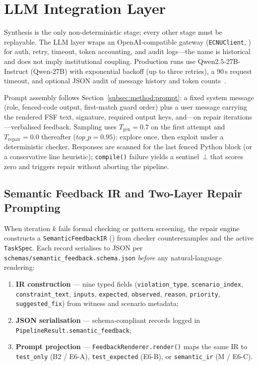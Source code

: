 \section{LLM Integration Layer}
\label{sec:impl:llm}

Synthesis is the only non-deterministic stage; every other stage must be
replayable.
The LLM layer wraps an OpenAI-compatible gateway
(\texttt{ECNUClient}, ) for auth, retry, timeout,
token accounting, and audit logs---the name is historical and does not imply
institutional coupling.
Production runs use Qwen2.5-27B-Instruct (\textsf{Qwen-27B}) with exponential
backoff (up to three retries), a 90\,s request timeout, and optional JSON
audit of message history and token counts~\citep{openai2023gpt4,chen2021codex}.

Prompt assembly follows Section~\ref{subsec:method:prompt}: a fixed system
message (role, fenced-code output, first-match guard order) plus a user
message carrying the rendered FSF text, signature, required output keys, and---on
repair iterations---verbalised feedback.
Sampling uses $T_\text{gen}{=}0.7$ on the first attempt and
$T_\text{repair}{=}0.0$ thereafter ($\mathit{top\_p}{=}0.95$): explore once,
then exploit under a deterministic checker.
Responses are scanned for the last fenced Python block (or a conservative
line heuristic); \texttt{compile()} failure yields a sentinel~$\bot$ that
scores zero and triggers repair without aborting the pipeline.

\subsection{Semantic Feedback IR and Two-Layer Repair Prompting}
\label{sec:impl:repair-feedback}

When iteration $k$ fails formal checking or pattern screening, the repair
engine constructs a \texttt{SemanticFeedbackIR}
() from checker counterexamples and the
active \texttt{TaskSpec}.
Each record serialises to JSON per
\texttt{schemas/semantic\_feedback.schema.json} \emph{before} any
natural-language rendering:
\begin{enumerate}
  \item \textbf{IR construction} --- nine typed fields
        (\texttt{violation\_type}, \texttt{scenario\_index},
        \texttt{constraint\_text}, \texttt{inputs}, \texttt{expected},
        \texttt{observed}, \texttt{reason}, \texttt{priority},
        \texttt{suggested\_fix}) from witness and scenario metadata;
  \item \textbf{JSON serialisation} --- schema-compliant records logged in
        \texttt{PipelineResult.semantic\_feedback};
  \item \textbf{Prompt projection} --- \texttt{FeedbackRenderer.render()}
        maps the same IR to \texttt{test\_only} (B2 / E6-A),
        \texttt{test\_expected} (E6-B), or \texttt{semantic\_ir} (M / E6-C).
\end{enumerate}

